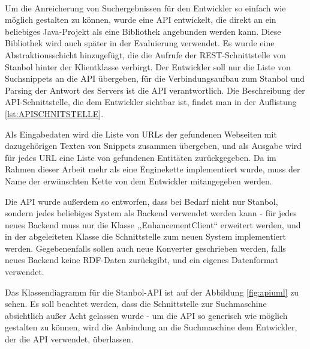 \paragraph{}
Um die Anreicherung von Suchergebnissen für den Entwickler so einfach wie möglich gestalten zu können, wurde eine API entwickelt, die direkt an ein beliebiges Java-Projekt als eine Bibliothek angebunden werden kann. Diese Bibliothek wird auch später in der Evaluierung verwendet. Es wurde eine Abstraktionsschicht hinzugefügt, die die Aufrufe der REST-Schnittstelle von Stanbol hinter der Klientklasse verbirgt. Der Entwickler soll nur die Liste von Suchsnippets an die API übergeben, für die Verbindungsaufbau zum Stanbol und Parsing der Antwort des Servers ist die API verantwortlich. Die Beschreibung der API-Schnittstelle, die dem Entwickler sichtbar ist, findet man in der Auflistung \ref{lst:APISCHNITSTELLE}. 

Als Eingabedaten wird die Liste von URLs der gefundenen Webseiten mit dazugehörigen Texten von Snippets zusammen übergeben, und als Ausgabe wird für jedes URL eine Liste von gefundenen Entitäten zurückgegeben. Da im Rahmen dieser Arbeit mehr als eine Enginekette implementiert wurde, muss der Name der erwünschten Kette von dem Entwickler mitangegeben werden.

Die API wurde außerdem so entworfen, dass bei Bedarf nicht nur Stanbol, sondern jedes beliebiges System als Backend verwendet werden kann - für jedes neues Backend muss nur die Klasse ,,EnhancementClient`` erweitert werden, und in der abgeleiteten Klasse die Schnittstelle zum neuen System implementiert werden. Gegebenenfalls sollen auch neue Konverter geschrieben werden, falls neues Backend keine RDF-Daten zurückgibt, und ein eigenes Datenformat verwendet.

Das Klassendiagramm für die Stanbol-API ist auf der Abbildung \ref{fig:apiuml} zu sehen. Es soll beachtet werden, dass die Schnittstelle zur Suchmaschine absichtlich außer Acht gelassen wurde - um die API so generisch wie möglich gestalten zu können, wird die Anbindung an die Suchmaschine dem Entwickler, der die API verwendet, überlassen.

